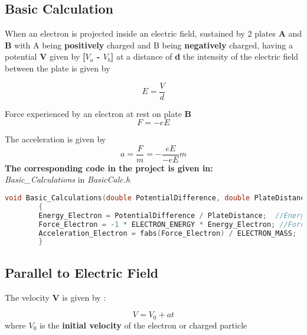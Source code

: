\documentclass[a4paper,20pt,twoside]{report}
\begin{document}
	\subsection{Basic Calculation}
		When an electron is projected inside an electric field, sustained by 2 plates
		\textbf{A} and \textbf{B}
		with A being 
		\textbf{positively}
		charged and B being
		\textbf{negatively}
	    charged, having a potential
		\textbf{V}
		 given by
		\textbf{[$V_a$ - $V_b$]}
		at a distance of \textbf{d}
		 the intensity of the electric field between the plate is given by
		
		\begin{equation}
		E = \frac{V}{d}
		\end{equation}
		
		
		Force experienced by an electron at rest on plate
		\textbf{B}
		\begin{equation}
		F = -eE
		\end{equation}
		
		\textnormal{The acceleration is given by}
		\begin{equation}
		a = \frac{F}{m} = -\frac{eE}{-eE}{m}
		\end{equation}
		\vspace{10mm}
		\textbf{The corresponding code in the project is given in:\\}
		\vspace{2mm}
		\textit{Basic\_Calculations} \textnormal{in }\textit{BasicCalc.h}
		\vspace{2mm}
		
		\begin{lstlisting}[language = C]
		void Basic_Calculations(double PotentialDifference, double PlateDistance)
		{
		Energy_Electron = PotentialDifference / PlateDistance;  //Energy of the electron
		Force_Electron = -1 * ELECTRON_ENERGY * Energy_Electron; //Force on electron at Plate B
		Acceleration_Electron = fabs(Force_Electron) / ELECTRON_MASS;  //Acceleration of Electron
		}
		\end{lstlisting}
		
		
		\subsection{Parallel to Electric Field}
			The velocity  \textbf{V} is given by :
			
			\begin{equation}
			V = V_0 + at
			\end{equation}
			where $V_0$ is the \textbf{initial velocity} of the electron or charged particle
			
\end{document}
